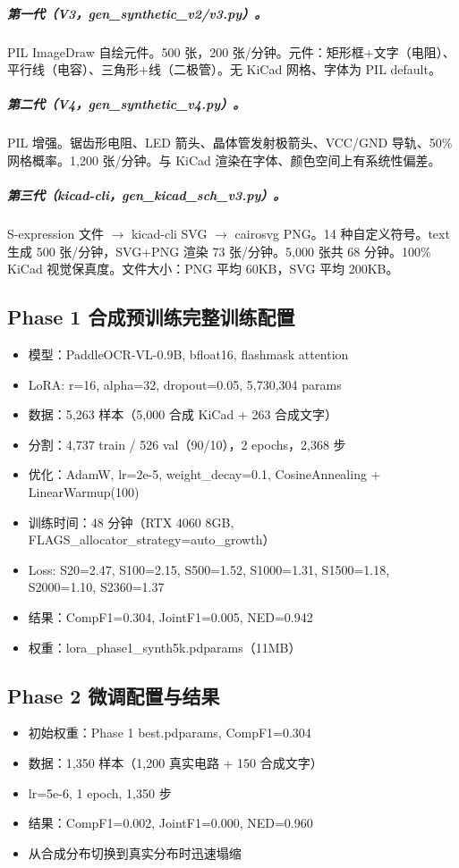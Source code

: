 \subparagraph{第一代（V3，gen\_synthetic\_v2/v3.py）。} PIL ImageDraw 自绘元件。500 张，200 张/分钟。元件：矩形框+文字（电阻）、平行线（电容）、三角形+线（二极管）。无 KiCad 网格、字体为 PIL default。

\subparagraph{第二代（V4，gen\_synthetic\_v4.py）。} PIL 增强。锯齿形电阻、LED 箭头、晶体管发射极箭头、VCC/GND 导轨、50\% 网格概率。1,200 张/分钟。与 KiCad 渲染在字体、颜色空间上有系统性偏差。

\subparagraph{第三代（kicad-cli，gen\_kicad\_sch\_v3.py）。} S-expression 文件 $\to$ kicad-cli SVG $\to$ cairosvg PNG。14 种自定义符号。text 生成 500 张/分钟，SVG+PNG 渲染 73 张/分钟。5,000 张共 68 分钟。100\% KiCad 视觉保真度。文件大小：PNG 平均 60KB，SVG 平均 200KB。

\subsection{Phase 1 合成预训练完整训练配置}

\begin{itemize}[nosep]
    \item 模型：PaddleOCR-VL-0.9B, bfloat16, flashmask attention
    \item LoRA: r=16, alpha=32, dropout=0.05, 5,730,304 params
    \item 数据：5,263 样本（5,000 合成 KiCad + 263 合成文字）
    \item 分割：4,737 train / 526 val（90/10），2 epochs，2,368 步
    \item 优化：AdamW, lr=2e-5, weight\_decay=0.1, CosineAnnealing + LinearWarmup(100)
    \item 训练时间：48 分钟（RTX 4060 8GB, FLAGS\_allocator\_strategy=auto\_growth）
    \item Loss: S20=2.47, S100=2.15, S500=1.52, S1000=1.31, S1500=1.18, S2000=1.10, S2360=1.37
    \item 结果：CompF1=0.304, JointF1=0.005, NED=0.942
    \item 权重：lora\_phase1\_synth5k.pdparams（11MB）
\end{itemize}

\subsection{Phase 2 微调配置与结果}

\begin{itemize}[nosep]
    \item 初始权重：Phase 1 best.pdparams, CompF1=0.304
    \item 数据：1,350 样本（1,200 真实电路 + 150 合成文字）
    \item lr=5e-6, 1 epoch, 1,350 步
    \item 结果：CompF1=0.002, JointF1=0.000, NED=0.960
    \item 从合成分布切换到真实分布时迅速塌缩
\end{itemize}

